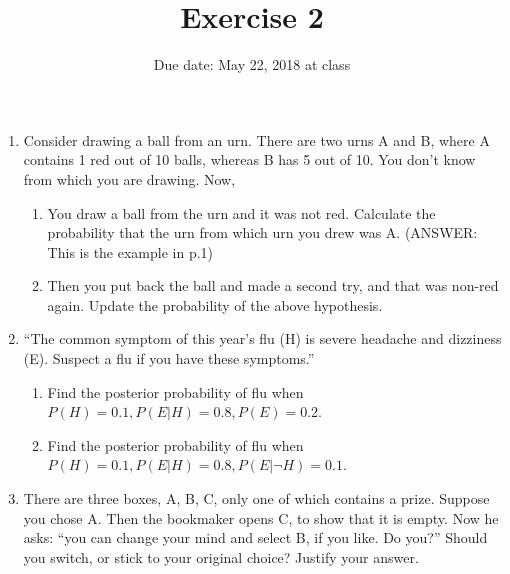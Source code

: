 \documentclass[11pt]{article}
\date{Due date: May 22, 2018 at class}
\title{Exercise 2}
\begin{document}
\maketitle
\begin{enumerate}
\item Consider drawing a ball from an urn. There are two urns A and B, where A contains 1 red out of 10 balls, whereas B has 5 out of 10. You don't know from which you are drawing. Now, 
\begin{enumerate}
\item You draw a ball from the urn and it was not red. Calculate the probability that the urn from which urn you drew was A. (ANSWER: This is the example in p.1)
\item Then you put back the ball and made a second try, and that was non-red again. Update the probability of the above hypothesis.
\end{enumerate}

\item ``The common symptom of this year's flu (H) is severe headache and dizziness (E). Suspect a flu if you have these symptoms.'' 
\begin{enumerate}
\item Find the posterior probability of flu when $P(H)=0.1, P(E|H)=0.8, P(E)=0.2$.
\item Find the posterior probability of flu when $P(H)=0.1, P(E|H)=0.8, P(E|\neg H)=0.1$.
\end{enumerate}

\item There are three boxes, A, B, C, only one of which contains a prize. Suppose you chose A. Then the bookmaker opens C, to show that it is empty. Now he asks: ``you can change your mind and select B, if you like. Do you?'' Should you switch, or stick to your original choice? Justify your answer.
\end{enumerate}
\end{document}
